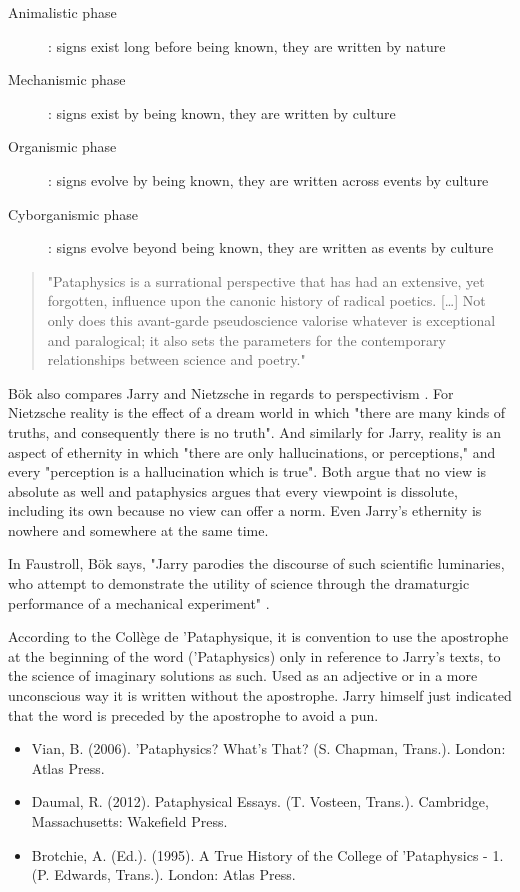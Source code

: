 \begin{description}
  \item [Animalistic phase]: signs exist long before being known, they are written by nature
  \item	[Mechanismic phase]: signs exist by being known, they are written by culture
  \item [Organismic phase]: signs evolve by being known, they are written across events by culture
  \item	[Cyborganismic phase]: signs evolve beyond being known, they are written as events by culture
\end{description}

\begin{quote}
  "Pataphysics is a surrational perspective that has had an extensive, yet forgotten, influence upon the canonic history of radical poetics. […] Not only does this avant-garde pseudoscience valorise whatever is exceptional and paralogical; it also sets the parameters for the contemporary relationships between science and poetry." \citep[p.27]{Bok2002}
\end{quote}

Bök also compares Jarry and Nietzsche in regards to perspectivism \citep[p.31]{Bok2002}. For Nietzsche reality is the effect of a dream world in which "there are many kinds of truths, and consequently there is no truth". And similarly for Jarry, reality is an aspect of ethernity in which "there are only hallucinations, or perceptions," and every "perception is a hallucination which is true". Both argue that no view is absolute as well and pataphysics argues that every viewpoint is dissolute, including its own because no view can offer a norm. Even Jarry's ethernity is nowhere and somewhere at the same time.

In Faustroll, Bök says, "Jarry parodies the discourse of such scientific luminaries, who attempt to demonstrate the utility of science through the dramaturgic performance of a mechanical experiment" \citep[p.29]{Bok2002}.

According to the Collège de 'Pataphysique, it is convention to use the apostrophe at the beginning of the word ('Pataphysics) only in reference to Jarry's texts, to the science of imaginary solutions as such. Used as an adjective or in a more unconscious way it is written without the apostrophe. Jarry himself just indicated that the word is preceded by the apostrophe to avoid a pun.

\begin{itemize}
  \item Vian, B. (2006). 'Pataphysics? What's That? (S. Chapman, Trans.). London: Atlas Press.\citep{Vian2006}
  \item Daumal, R. (2012). Pataphysical Essays. (T. Vosteen, Trans.). Cambridge, Massachusetts: Wakefield Press.\citep{Daumal2012}
  \item Brotchie, A. (Ed.). (1995). A True History of the College of  'Pataphysics - 1. (P. Edwards, Trans.). London: Atlas Press.\citep{Brotchie1995}
\end{itemize}



